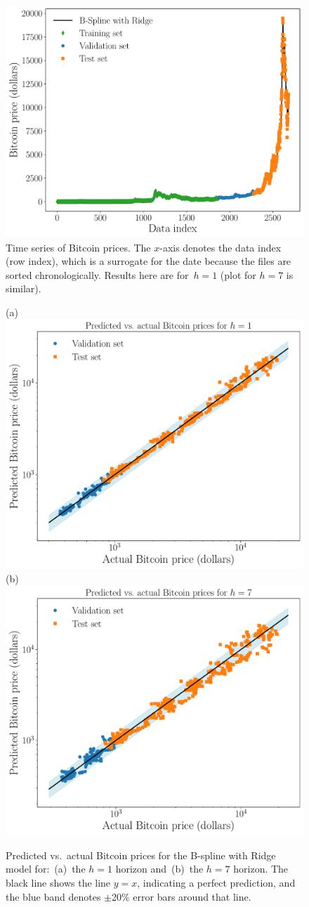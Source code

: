 \documentclass{article}
\begin{document}
\begin{figure}
    \centering
    \includegraphics[width=0.45\linewidth]{figures/bitcoin_prices_h1.pdf}
    \caption{Time series of Bitcoin prices. The $x$-axis denotes the data index (row index), which is a surrogate for the date because the files are sorted chronologically. Results here are for~$h=1$ (plot for $h=7$ is similar).}
    \label{fig:prices_h1}
\end{figure}

\begin{figure}[ht]
    \centering
    (a)\includegraphics[width=0.45\linewidth]{figures/actual_vs_predicted_h1.pdf}
    (b)\includegraphics[width=0.45\linewidth]{figures/actual_vs_predicted_h7.pdf}
    \caption{Predicted vs.\ actual Bitcoin prices for the B-spline with Ridge model for:~(a)~the $h=1$ horizon and~(b)~the $h=7$ horizon. The black line shows the line $y=x$, indicating a perfect prediction, and the blue band denotes $\pm$20\% error bars around that line.}
    \label{fig:actual_vs_predicted}
\end{figure}
\end{document}
